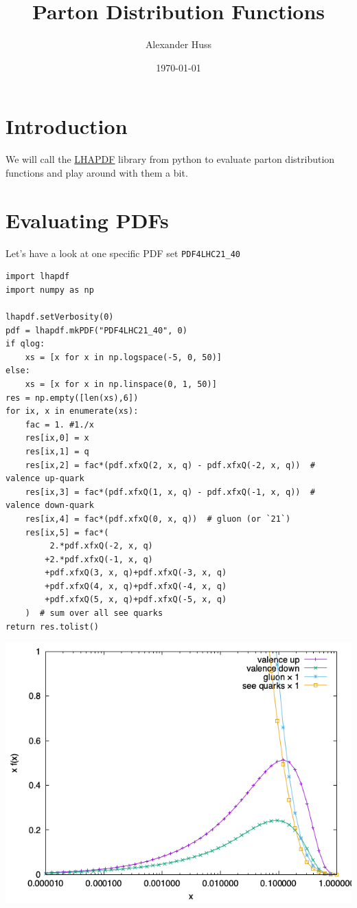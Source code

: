 \documentclass[11pt]{article}
\author{Alexander Huss}
\date{\today}
\title{Parton Distribution Functions}
\begin{document}
\maketitle
\tableofcontents

\section{Introduction}
\label{sec:org562a89e}
We will call the \href{https://lhapdf.hepforge.org/}{LHAPDF} library from python to evaluate parton distribution functions and play around with them a bit.
\section{Evaluating PDFs}
\label{sec:orgba26df0}
Let's have a look at one specific PDF set \texttt{PDF4LHC21\_40}

\begin{verbatim}
import lhapdf
import numpy as np

lhapdf.setVerbosity(0)
pdf = lhapdf.mkPDF("PDF4LHC21_40", 0)
if qlog:
    xs = [x for x in np.logspace(-5, 0, 50)]
else:
    xs = [x for x in np.linspace(0, 1, 50)]
res = np.empty([len(xs),6])
for ix, x in enumerate(xs):
    fac = 1. #1./x
    res[ix,0] = x
    res[ix,1] = q
    res[ix,2] = fac*(pdf.xfxQ(2, x, q) - pdf.xfxQ(-2, x, q))  # valence up-quark
    res[ix,3] = fac*(pdf.xfxQ(1, x, q) - pdf.xfxQ(-1, x, q))  # valence down-quark
    res[ix,4] = fac*(pdf.xfxQ(0, x, q))  # gluon (or `21`)
    res[ix,5] = fac*(
         2.*pdf.xfxQ(-2, x, q)
        +2.*pdf.xfxQ(-1, x, q)
        +pdf.xfxQ(3, x, q)+pdf.xfxQ(-3, x, q)
        +pdf.xfxQ(4, x, q)+pdf.xfxQ(-4, x, q)
        +pdf.xfxQ(5, x, q)+pdf.xfxQ(-5, x, q)
    )  # sum over all see quarks
return res.tolist()
\end{verbatim}

\begin{center}
\includegraphics[width=.9\linewidth]{pdf_xfx.png}
\label{}
\end{center}
\end{document}
